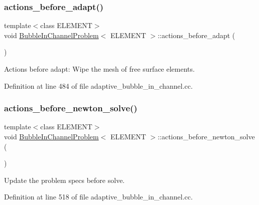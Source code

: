 \subsubsection{\texorpdfstring{actions\+\_\+before\+\_\+adapt()}{actions\_before\_adapt()}}
{\footnotesize\ttfamily template$<$class E\+L\+E\+M\+E\+NT$>$ \\
void \hyperlink{classBubbleInChannelProblem}{Bubble\+In\+Channel\+Problem}$<$ E\+L\+E\+M\+E\+NT $>$\+::actions\+\_\+before\+\_\+adapt (\begin{DoxyParamCaption}{ }\end{DoxyParamCaption})\hspace{0.3cm}{\ttfamily [inline]}}



Actions before adapt\+: Wipe the mesh of free surface elements. 



Definition at line 484 of file adaptive\+\_\+bubble\+\_\+in\+\_\+channel.\+cc.

\mbox{\label{classBubbleInChannelProblem_aef53cd0e961bd899e50806ec39f5a3fd}} 
\subsubsection{\texorpdfstring{actions\+\_\+before\+\_\+newton\+\_\+solve()}{actions\_before\_newton\_solve()}}
{\footnotesize\ttfamily template$<$class E\+L\+E\+M\+E\+NT$>$ \\
void \hyperlink{classBubbleInChannelProblem}{Bubble\+In\+Channel\+Problem}$<$ E\+L\+E\+M\+E\+NT $>$\+::actions\+\_\+before\+\_\+newton\+\_\+solve (\begin{DoxyParamCaption}{ }\end{DoxyParamCaption})\hspace{0.3cm}{\ttfamily [inline]}}



Update the problem specs before solve. 



Definition at line 518 of file adaptive\+\_\+bubble\+\_\+in\+\_\+channel.\+cc.

\mbox{\label{classBubbleInChannelProblem_a7b3c042477f4ee4e62dd1e00e1a480f8}} 
